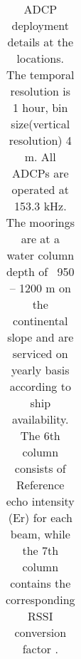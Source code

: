 \documentclass{article}
\begin{document}
\linespread{1} 	
\begin{table}[htbp]

	{\footnotesize

		\captionsetup{justification=justified,font=footnotesize,skip=0.05\baselineskip} %
		\caption{ADCP deployment details at the locations. The temporal resolution is 1 hour, bin size(vertical resolution) 4 m. All ADCPs are operated at 153.3 kHz. The moorings are at a water column depth of ~950 -- 1200 m on the continental slope and are serviced on yearly basis according to ship availability. The 6th column consists of Reference echo intensity (Er) for each beam, while the 7th column contains the corresponding RSSI conversion factor \citep{deines1999backscatter}.}
		\begin{adjustwidth}{0in}{0in} 
			\begin{tabular}{ccccccc}
				

\end{tabular}
\end{adjustwidth}}
\end{table}
\end{document}

